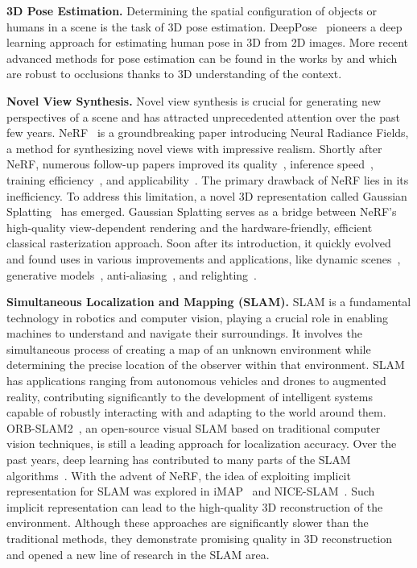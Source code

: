 \vspace{1ex}
\noindent\textbf{3D Pose Estimation.} Determining the spatial configuration of objects or humans in a scene is the task of 3D pose estimation. DeepPose~\citep{toshev2014deeppose} pioneers a deep learning approach for estimating human pose in 3D from 2D images. More recent advanced methods for pose estimation can be found in the works by \cite{zhang20233d} and \cite{zhou2023deep} which are robust to occlusions thanks to 3D understanding of the context.

\vspace{1ex}
\noindent\textbf{Novel View Synthesis.}
Novel view synthesis is crucial for generating new perspectives of a scene and has attracted unprecedented attention over the past few years. NeRF~\citep{mildenhall2020nerf} is a groundbreaking paper introducing Neural Radiance Fields, a method for synthesizing novel views with impressive realism. Shortly after NeRF, numerous follow-up papers improved its quality~\citep{Barron_2021_ICCV, hu2023tri}, inference speed~\citep{fridovich2022plenoxels, garbin2021fastnerf}, training efficiency~\citep{sun2022direct, muller2022instant}, and applicability~\citep{meshry2019neural, park2021nerfies, chan2022efficient}. The primary drawback of NeRF lies in its inefficiency. To address this limitation, a novel 3D representation called Gaussian Splatting~\citep{kerbl20233d} has emerged. Gaussian Splatting serves as a bridge between NeRF's high-quality view-dependent rendering and the hardware-friendly, efficient classical rasterization approach. Soon after its introduction, it quickly evolved and found uses in various improvements and applications, like dynamic scenes~\citep{luiten2023dynamic,yang2023deformable}, generative models~\citep{chen2023text,tang2023dreamgaussian}, anti-aliasing~\citep{yu2023mip}, and relighting~\citep{gao2023relightable}.

\vspace{1ex}
\noindent\textbf{Simultaneous Localization and Mapping (SLAM).} SLAM is a fundamental technology in robotics and computer vision, playing a crucial role in enabling machines to understand and navigate their surroundings. It involves the simultaneous process of creating a map of an unknown environment while determining the precise location of the observer within that environment. SLAM has applications ranging from autonomous vehicles and drones to augmented reality, contributing significantly to the development of intelligent systems capable of robustly interacting with and adapting to the world around them. ORB-SLAM2~\citep{mur2017orb}, an open-source visual SLAM based on traditional computer vision techniques, is still a leading approach for localization accuracy. Over the past years, deep learning has contributed to many parts of the SLAM algorithms~\citep{mokssit2023deep}. With the advent of NeRF, the idea of exploiting implicit representation for SLAM was explored in iMAP~\citep{sucar2021imap} and NICE-SLAM~\citep{zhu2022nice}. Such implicit representation can lead to the high-quality 3D reconstruction of the environment. Although these approaches are significantly slower than the traditional methods, they demonstrate promising quality in 3D reconstruction and opened a new line of research in the SLAM area.

